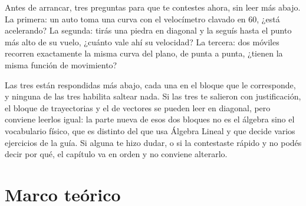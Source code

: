 \documentclass[11pt,openany]{book}
\begin{document}
Antes de arrancar, tres preguntas para que te contestes ahora, sin leer más abajo. La primera: un auto toma una curva con el velocímetro clavado en 60, ¿está acelerando? La segunda: tirás una piedra en diagonal y la seguís hasta el punto más alto de su vuelo, ¿cuánto vale ahí su velocidad? La tercera: dos móviles recorren exactamente la misma curva del plano, de punta a punta, ¿tienen la misma función de movimiento?

Las tres están respondidas más abajo, cada una en el bloque que le corresponde, y ninguna de las tres habilita saltear nada. Si las tres te salieron con justificación, el bloque de trayectorias y el de vectores se pueden leer en diagonal, pero conviene leerlos igual: la parte nueva de esos dos bloques no es el álgebra sino el vocabulario físico, que es distinto del que usa Álgebra Lineal y que decide varios ejercicios de la guía. Si alguna te hizo dudar, o si la contestaste rápido y no podés decir por qué, el capítulo va en orden y no conviene alterarlo.

\section{Marco teórico}
\end{document}
